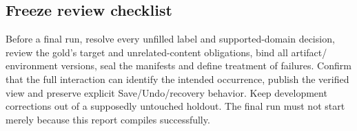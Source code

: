 \subsection{Freeze review checklist}
Before a final run, resolve every unfilled label and supported-domain decision,
review the gold's target and unrelated-content obligations, bind all artifact/
environment versions, seal the manifests and define treatment of failures.
Confirm that the full interaction can identify the intended occurrence,
publish the verified view and preserve explicit Save/Undo/recovery behavior.
Keep development corrections out of a supposedly untouched holdout. The final
run must not start merely because this report compiles successfully.
